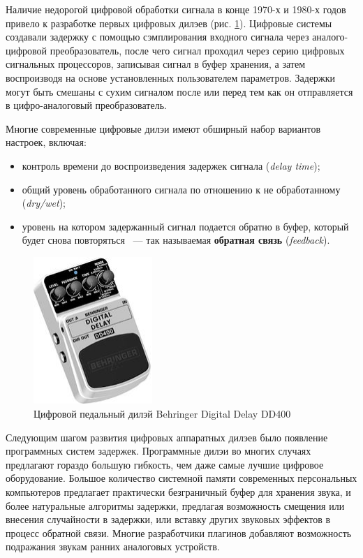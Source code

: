 \documentclass[oneside, final, 14pt]{extreport}
\begin{document}
Наличие недорогой цифровой обработки сигнала в конце 1970-х и 1980-х годов привело к разработке первых цифровых дилэев (рис. \ref{pic-delay-04}). Цифровые системы создавали задержку с помощью сэмплирования входного сигнала через аналого-цифровой преобразователь, после чего сигнал проходил через серию цифровых сигнальных процессоров, записывая сигнал в буфер хранения, а затем воспроизводя на основе установленных пользователем параметров. Задержки могут быть смешаны с сухим сигналом после или перед тем как он отправляется в цифро-аналоговый преобразователь.

Многие современные цифровые дилэи имеют обширный набор вариантов настроек, включая:
\begin{itemize}
  \item контроль времени до воспроизведения задержек сигнала (\emph{delay time});
  \item общий уровень обработанного сигнала по отношению к не обработанному (\emph{dry/wet});
  \item уровень на котором задержанный сигнал подается обратно в буфер, который будет снова повторяться ~--- так называемая \textbf{обратная связь} (\emph{feedback}).
\end{itemize}

\begin{figure}[h!]
  \centering
  \includegraphics[width=0.4\textwidth]{pic-delay-04}
  \caption{Цифровой педальный дилэй Behringer Digital Delay DD400}
  \label{pic-delay-04}
\end{figure}

Следующим шагом развития цифровых аппаратных дилэев было появление программных систем задержек. Программные дилэи во многих случаях предлагают гораздо большую гибкость, чем даже самые лучшие цифровое оборудование. Большое количество системной памяти современных персональных компьютеров предлагает практически безграничный буфер для хранения звука, и более натуральные алгоритмы задержки, предлагая возможность смещения или внесения случайности в задержки, или вставку других звуковых эффектов в процесс обратной связи. Многие разработчики плагинов добавляют возможность подражания звукам ранних аналоговых устройств.
\end{document}
